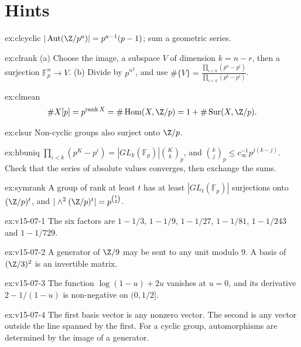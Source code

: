 \section{Hints}

\begin{hint}{ex:clcyclic}
$|\operatorname{Aut}(\Z/p^a)|=p^{a-1}(p-1)$; sum a geometric series.
\end{hint}
\begin{hint}{ex:clrank}
(a) Choose the image, a subspace $V$ of dimension $k=n-r$, then a surjection $\mathbb F_p^n\to V$. (b) Divide by $p^{n^2}$, and use $\#\{V\}=\frac{\prod_{i<k}(p^n-p^i)}{\prod_{i<k}(p^k-p^i)}$.
\end{hint}
\begin{hint}{ex:clmean}
\[\#X[p]=p^{\operatorname{rank}X}=\#\operatorname{Hom}(X,\Z/p)=1+\#\operatorname{Sur}(X,\Z/p).\]
\end{hint}
\begin{hint}{ex:clsur}
Non-cyclic groups also surject onto $\Z/p$.
\end{hint}
\begin{hint}{ex:hbuniq}
$\prod_{i<k}(p^K-p^i)=|GL_k(\mathbb F_p)|\binom Kk_p$, and $\binom kj_p\le c_\infty^{-1}p^{j(k-j)}$. Check that the series of absolute values converges, then exchange the sums.
\end{hint}

\begin{hint}{ex:symrank}
A group of rank at least $t$ has at least $|GL_t(\mathbb F_p)|$ surjections onto $(\Z/p)^t$, and $|\wedge^2(\Z/p)^t|=p^{\binom t2}$.
\end{hint}

\begin{hint}{ex:v15-07-1}
The six factors are \(1-1/3\), \(1-1/9\), \(1-1/27\), \(1-1/81\), \(1-1/243\) and \(1-1/729\).
\end{hint}

\begin{hint}{ex:v15-07-2}
A generator of \(\Z/9\) may be sent to any unit modulo \(9\). A basis of \((\Z/3)^2\) is an invertible matrix.
\end{hint}

\begin{hint}{ex:v15-07-3}
The function \(\log(1-u)+2u\) vanishes at \(u=0\), and its derivative \(2-1/(1-u)\) is non-negative on \((0,1/2]\).
\end{hint}

\begin{hint}{ex:v15-07-4}
The first basis vector is any nonzero vector. The second is any vector outside the line spanned by the first. For a cyclic group, automorphisms are determined by the image of a generator.
\end{hint}

